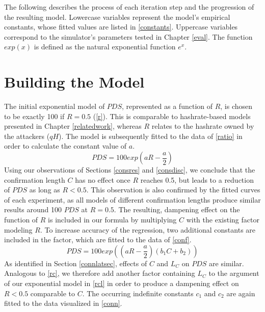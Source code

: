 \documentclass[a4paper,12pt,twoside]{report}
\begin{document}
The following describes the process of each iteration step and the progression of the resulting model. Lowercase variables represent the model's empirical constants, whose fitted values are listed in \autoref{constants}. Uppercase variables correspond to the simulator's parameters tested in Chapter \ref{eval}. The function $exp(x)$ is defined as the natural exponential function $e^x$.
\section{Building the Model} \label{building}
The initial exponential model of $PDS$, represented as a function of $R$, is chosen to be exactly 100 if $R = 0.5$ (\autoref{r}). This is comparable to hashrate-based models presented in Chapter \ref{relatedwork}, whereas $R$ relates to the hashrate owned by the attackers ($qH$).  The model is subsequently fitted to the data of \autoref{ratio} in order to calculate the constant value of $a$.
\begin{equation}\label{r}
PDS = 100 exp \left(a R- \frac{a}{2} \right)
\end{equation}
Using our observations of Sections \ref{consres} and \ref{consdisc}, we conclude that the confirmation length $C$ has no effect once $R$ reaches 0.5, but leads to a reduction of $PDS$ as long as $R < 0.5$. This observation is also confirmed by the fitted curves of each experiment, as all models of different confirmation lengths produce similar results around 100 $PDS$ at $R = 0.5$. The resulting, dampening effect on the function of $R$ is included in our formula by multiplying $C$ with the existing factor modeling $R$. To increase accuracy of the regression, two additional constants are included in the factor, which are fitted to the data of \autoref{conf}.
\begin{equation}\label{rc}
PDS = 100 exp \left( \left( a R- \frac{a}{2} \right) \left( b_1C+b_2 \right) \right)
\end{equation}
As identified in Section \ref{connlatsec}, effects of $C$ and $L_C$ on $PDS$ are similar. Analogous to \autoref{rc}, we therefore add another factor containing $L_C$ to the argument of our exponential model in \autoref{rcl} in order to produce a dampening effect on $R < 0.5$ comparable to $C$. The occurring indefinite constants $c_1$ and $c_2$ are again fitted to the data visualized in \autoref{conn}. 
\end{document}
